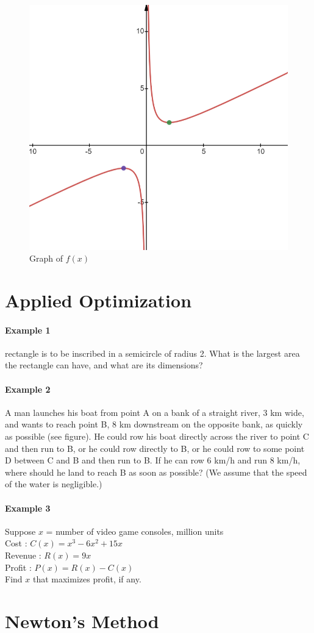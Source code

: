\documentclass[12pt]{article}
\begin{document}
\begin{figure}[h!]
     \centering
     \includegraphics[width = 0.5\linewidth]{Images/graph sketching example.png}
     \caption{Graph of $f(x)$}
\end{figure}
\section{Applied Optimization}
\paragraph{Example 1}
rectangle is to be inscribed in a semicircle of radius 2. What is the
largest area the rectangle can have, and what are its dimensions?

\paragraph{Example 2}
A man launches his boat from point A on a bank of a straight river, 3 km wide, 
and wants to reach point B, 8 km downstream on the opposite bank, as quickly as possible (see figure). He could row his boat directly across the river to point C 
and then run to B, or he could row directly to B, or he could row to some point D between C and B and then run to B. If he can row 6 km/h and run 8 km/h, where should 
he land to reach B as soon as possible? (We assume that the speed of the water is negligible.) 

\paragraph{Example 3}
Suppose $x$ = number of video game consoles, million units \\
Cost : $C(x) = x^3 - 6x^2 + 15x$ \\
Revenue : $R(x) = 9x$ \\
Profit : $P(x) = R(x) - C(x)$ \\
Find $x$ that maximizes profit, if any.

\section{Newton's Method}
\end{document}

